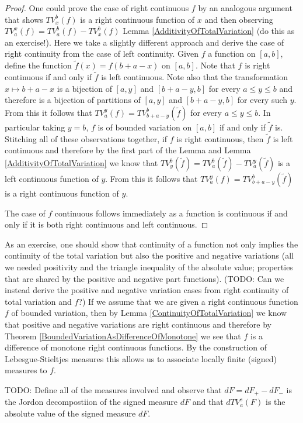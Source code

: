 \begin{proof}
One could prove the case of right continuous $f$ by an analogous
argument that shows $TV_x^b(f)$ is a right continuous function of $x$
and then observing $TV_a^x(f) = TV_a^b(f) - TV_x^b(f)$ Lemma
\ref{AdditivityOfTotalVariation} (do this as an exercise!).  Here we take a slightly different
approach and derive the case of right continuity from the case of left
continuity.  Given $f$ a function on $[a,b]$, define the function
$\tilde{f}(x) = f(b+a-x)$ on $[a,b]$.  Note that $f$ is right
continuous if and only if $\tilde{f}$ is left continuous.  Note also
that the transformation $x \mapsto b+a-x$ is a bijection of $[a,y]$
and $[b+a-y,b]$ for every $a \leq y \leq b$
and therefore is a bijection of partitions of $[a,y]$ and $[b+a-y,b]$
for every such $y$.  From this it follows that $TV_a^y(f) =
TV_{b+a-y}^b(\tilde{f})$ for every $a \leq y \leq b$.  In particular
taking $y=b$,
$f$ is of bounded variation on $[a,b]$ if and only if $\tilde{f}$ is.
Stitching all of these observations together, if $f$ is right
continuous, then $\tilde{f}$ is left continuous and therefore by the
first part of the Lemma and Lemma \ref{AdditivityOfTotalVariation} we
know that $TV_{y}^b(\tilde{f}) = TV_a^b(\tilde{f}) -
TV_a^{y} (\tilde{f})$ is a left continuous function of $y$.  From this
it follows that $TV_a^y(f) = TV_{b+a-y}^b(\tilde{f})$ is a right
continuous function of $y$.

The case of $f$ continuous follows immediately as a function is
continuous if and only if it is both right continuous and left continuous.
\end{proof}

As an exercise, one should show that continuity of a function not only
implies the continuity of the total variation but also the positive
and negative variations (all we needed positivity and the triangle
inequality of the absolute value; properties that are shared by the
positive and negative part functions).  (TODO: Can we instead derive the
positive and negative variation cases from right continuity of total
variation and $f$?)
If we assume that we are given a right continuous function $f$ of bounded
variation, then by Lemma \ref{ContinuityOfTotalVariation} we know that
positive and negative variations are right continuous and therefore by
Theorem \ref{BoundedVariationAsDifferenceOfMonotone} we see that $f$
is a difference of monotone right continuous functions.  By the
construction of Lebesgue-Stieltjes measures this allows us to
associate locally finite (signed) measures to $f$.  

TODO: Define all of the measures involved and observe that $dF = dF_+ - dF_-$
is the Jordon decompostiion of the signed measure $dF$ and that $dTV_a^s(F)$ is the
absolute value of the signed measure $dF$.

